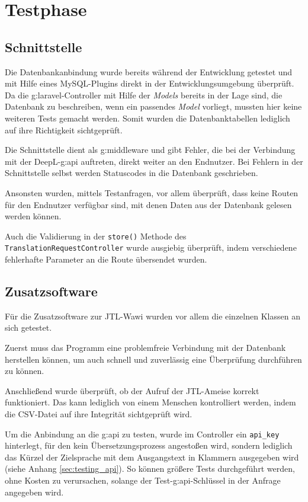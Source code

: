 \section{Testphase}
\subsection{Schnittstelle}
Die Datenbankanbindung wurde bereits während der Entwicklung getestet und mit Hilfe eines MySQL-Plugins direkt in der Entwicklungsumgebung überprüft.
Da die \gls{g:laravel}-Controller mit Hilfe der \emph{Models} bereits in der Lage sind, die Datenbank zu beschreiben, wenn ein passendes \emph{Model} vorliegt, mussten hier keine weiteren Tests gemacht werden.
Somit wurden die Datenbanktabellen lediglich auf ihre Richtigkeit sichtgeprüft. 

Die Schnittstelle dient als \gls{g:middleware} und gibt Fehler, die bei der Verbindung mit der DeepL-\gls{g:api} auftreten, direkt weiter an den Endnutzer.
Bei Fehlern in der Schnittstelle selbst werden Statuscodes in die Datenbank geschrieben.

Ansonsten wurden, mittels Testanfragen, vor allem überprüft, dass keine Routen für den Endnutzer verfügbar sind, mit denen Daten aus der Datenbank gelesen werden können.

Auch die Validierung in der \texttt{store()} Methode des \texttt{TranslationRequestController} wurde ausgiebig überprüft, indem verschiedene fehlerhafte Parameter an die Route übersendet wurden. 

\subsection{Zusatzsoftware}
Für die Zusatzsoftware zur JTL-Wawi wurden vor allem die einzelnen Klassen an sich getestet. 

Zuerst muss das Programm eine problemfreie Verbindung mit der Datenbank herstellen können, um auch schnell und zuverlässig eine Überprüfung durchführen zu können.

Anschließend wurde überprüft, ob der Aufruf der JTL-Ameise korrekt funktioniert. 
Das kann lediglich von einem Menschen kontrolliert werden, indem die CSV-Datei auf ihre Integrität sichtgeprüft wird.

Um die Anbindung an die \gls{g:api} zu testen, wurde im Controller ein \texttt{api\_key} hinterlegt, für den kein Übersetzungsprozess angestoßen wird, 
sondern lediglich das Kürzel der Zielsprache mit dem Ausgangstext in Klammern ausgegeben wird (siehe Anhang \ref{sec:testing_api}).
So können größere Tests durchgeführt werden, ohne Kosten zu verursachen, solange der Test-\gls{g:api}-Schlüssel in der Anfrage angegeben wird.